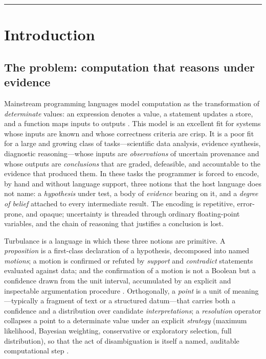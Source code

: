 \documentclass[11pt,a4paper]{article}
\theoremstyle{plain}
\theoremstyle{definition}
\theoremstyle{remark}
\begin{document}
\tableofcontents
\bigskip
\hrule

\section{Introduction}
\label{sec:intro}

\subsection{The problem: computation that reasons under evidence}

Mainstream programming languages model computation as the transformation of
\emph{determinate} values: an expression denotes a value, a statement updates a
store, and a function maps inputs to outputs \citep{landin1966,winskel1993,
pierce2002}. This model is an excellent fit for systems whose inputs are known
and whose correctness criteria are crisp. It is a poor fit for a large and
growing class of tasks---scientific data analysis, evidence synthesis,
diagnostic reasoning---whose inputs are \emph{observations} of uncertain
provenance and whose outputs are \emph{conclusions} that are graded,
defeasible, and accountable to the evidence that produced them. In these tasks
the programmer is forced to encode, by hand and without language support, three
notions that the host language does not name: a \emph{hypothesis} under test, a
body of \emph{evidence} bearing on it, and a \emph{degree of belief} attached
to every intermediate result. The encoding is repetitive, error-prone, and
opaque; uncertainty is threaded through ordinary floating-point variables, and
the chain of reasoning that justifies a conclusion is lost.

Turbulance is a language in which these three notions are primitive. A
\emph{proposition} is a first-class declaration of a hypothesis, decomposed
into named \emph{motions}; a motion is confirmed or refuted by \emph{support}
and \emph{contradict} statements evaluated against data; and the confirmation
of a motion is not a Boolean but a confidence drawn from the unit interval,
accumulated by an explicit and inspectable argumentation procedure
\citep{toulmin1958,dung1995,shafer1976}. Orthogonally, a \emph{point} is a unit
of meaning---typically a fragment of text or a structured datum---that carries
both a confidence and a distribution over candidate \emph{interpretations}; a
\emph{resolution} operator collapses a point to a determinate value under an
explicit \emph{strategy} (maximum likelihood, Bayesian weighting, conservative
or exploratory selection, full distribution), so that the act of disambiguation
is itself a named, auditable computational step \citep{zadeh1965,kozen1981,
goodman2008}.
\end{document}
